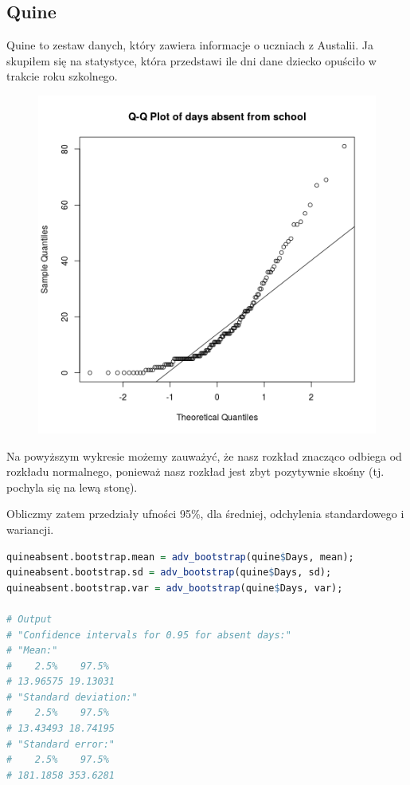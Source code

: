 \documentclass[11pt]{article}
\begin{document}
\pagebreak

\subsection{Quine}
Quine to zestaw danych, który zawiera informacje o uczniach z Austalii. Ja skupiłem
się na statystyce, która przedstawi ile dni dane dziecko opuściło w trakcie roku szkolnego.

\begin{figure}[h]
\includegraphics[scale=0.5]{quineabsent_qq.png}
\centering
\end{figure}

Na powyższym wykresie możemy zauważyć, że nasz rozkład znacząco odbiega od
rozkładu normalnego, ponieważ nasz rozkład jest zbyt pozytywnie skośny (tj. 
pochyla się na lewą stonę).

Obliczmy zatem przedziały ufności 95\%, dla średniej, odchylenia standardowego i wariancji.

\begin{lstlisting}[language=R]
quineabsent.bootstrap.mean = adv_bootstrap(quine$Days, mean);
quineabsent.bootstrap.sd = adv_bootstrap(quine$Days, sd);
quineabsent.bootstrap.var = adv_bootstrap(quine$Days, var);

# Output
# "Confidence intervals for 0.95 for absent days:"
# "Mean:"
#    2.5%    97.5% 
# 13.96575 19.13031 
# "Standard deviation:"
#    2.5%    97.5% 
# 13.43493 18.74195 
# "Standard error:"
#    2.5%    97.5% 
# 181.1858 353.6281 
\end{lstlisting}
\end{document}
